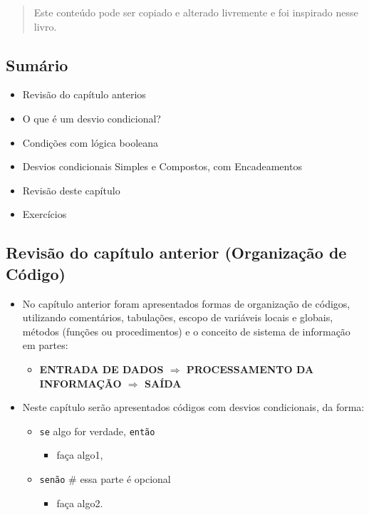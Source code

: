 \documentclass[12pt,a4paper]{article}
\providecommand{\tightlist}{%
      \setlength{\itemsep}{0pt}\setlength{\parskip}{0pt}}
\begin{document}
\begin{quote}
Este conteúdo pode ser copiado e alterado livremente e foi inspirado
nesse livro.
\end{quote}

    \hypertarget{sumuxe1rio}{%
\subsection{Sumário}\label{sumuxe1rio}}

\begin{itemize}
\tightlist
\item
  Revisão do capítulo anterios
\item
  O que é um desvio condicional?
\item
  Condições com lógica booleana
\item
  Desvios condicionais Simples e Compostos, com Encadeamentos
\item
  Revisão deste capítulo
\item
  Exercícios
\end{itemize}

    \hypertarget{revisuxe3o-do-capuxedtulo-anterior-organizauxe7uxe3o-de-cuxf3digo}{%
\subsection{Revisão do capítulo anterior (Organização de
Código)}\label{revisuxe3o-do-capuxedtulo-anterior-organizauxe7uxe3o-de-cuxf3digo}}

    \begin{itemize}
\item
  No capítulo anterior foram apresentados formas de organização de
  códigos, utilizando comentários, tabulações, escopo de variáveis
  locais e globais, métodos (funções ou procedimentos) e o conceito de
  sistema de informação em partes:

  \begin{itemize}
  \tightlist
  \item
    \textbf{ENTRADA DE DADOS \(\Rightarrow\) PROCESSAMENTO DA INFORMAÇÃO
    \(\Rightarrow\) SAÍDA}
  \end{itemize}
\item
  Neste capítulo serão apresentados códigos com desvios condicionais, da
  forma:

  \begin{itemize}
  \tightlist
  \item
    \texttt{se} algo for verdade, \texttt{então}

    \begin{itemize}
    \tightlist
    \item
      faça algo1,
    \end{itemize}
  \item
    \texttt{senão} \# essa parte é opcional

    \begin{itemize}
    \tightlist
    \item
      faça algo2.
    \end{itemize}
  \end{itemize}
\end{itemize}
\end{document}
